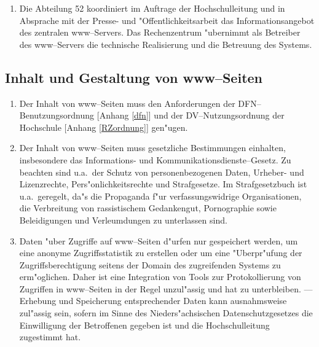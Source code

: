 \documentclass[12pt,titlepage,twoside]{scrartcl}
\begin{document}
\begin{appendix}
\begin{enumerate}
  \item Die Abteilung 52 koordiniert im Auftrage der Hochschulleitung und
        in Absprache mit der Presse- und "Offentlichkeitsarbeit
        das Informationsangebot des zentralen www--Servers. Das
        Rechenzentrum "ubernimmt als Betreiber des www--Servers die
        technische Realisierung und die Betreuung des Systems.
\end{enumerate}

\subsection{Inhalt und Gestaltung von www--Seiten}

\begin{enumerate}
  \item Der Inhalt von www--Seiten muss den Anforderungen der
        DFN--Benutzungsordnung [Anhang \ref{dfn}] und der DV--Nutzungsordnung
        der Hochschule [Anhang \ref{RZordnung}] gen"ugen.

  \item Der Inhalt von www--Seiten muss gesetzliche Bestimmungen einhalten,
        insbesondere das Informations- und Kommunikationsdienste--Gesetz.
        Zu beachten sind u.a.\  der Schutz von personenbezogenen Daten,
        Urheber- und Lizenzrechte, Pers"onlichkeitsrechte und
        Strafgesetze. Im Strafgesetzbuch ist u.a.\  geregelt, da"s
        die Propaganda f"ur verfassungswidrige Organisationen, die
        Verbreitung von rassistischem Gedankengut, Pornographie sowie
        Beleidigungen und Verleumdungen zu unterlassen sind.

  \item Daten "uber Zugriffe auf www--Seiten d"urfen nur gespeichert
        werden, um eine anonyme Zugriffsstatistik zu erstellen oder
        um eine "Uberpr"ufung der Zugriffsberechtigung seitens
        der Domain des zugreifenden Systems zu erm"oglichen.
        Daher ist eine Integration von Tools zur Protokollierung von
        Zugriffen in www--Seiten in der Regel unzul"assig und hat
        zu unterbleiben. --- Erhebung und Speicherung entsprechender Daten
        kann ausnahmsweise zul"assig sein, sofern im Sinne des
        Nieders"achsischen Datenschutzgesetzes
        die Einwilligung der Betroffenen gegeben ist und die
        Hochschulleitung zugestimmt hat.


\end{enumerate}
\end{appendix}
\end{document}
